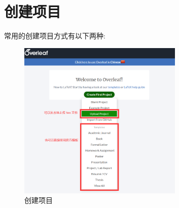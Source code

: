 \documentclass{booki}
\begin{document}
\section{创建项目}\label{header-n10}

常用的创建项目方式有以下两种:
\begin{figure}[H]
    \centering
    \includegraphics[width=0.7\textwidth]{Guidepics/20210415183951.png}
    \caption{创建项目}
\end{figure}
\end{document}
